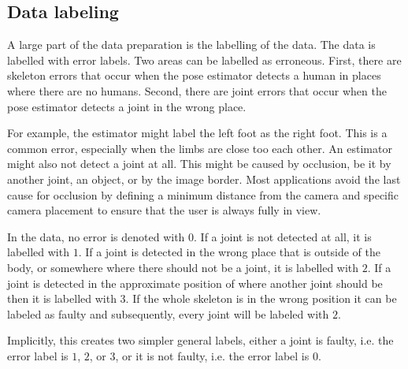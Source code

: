 \subsection{Data labeling}
\label{sec:data_labeling}

A large part of the data preparation is the labelling of the data. The data is labelled with error labels. Two areas can be labelled as erroneous. First, there are skeleton errors that occur when the pose estimator detects a human in places where there are no humans. Second, there are joint errors that occur when the pose estimator detects a joint in the wrong place. 

For example, the estimator might label the left foot as the right foot. This is a common error, especially when the limbs are close too each other. An estimator might also not detect a joint at all. This might be caused by occlusion, be it by another joint, an object, or by the image border. Most applications avoid the last cause for occlusion by defining a minimum distance from the camera and specific camera placement to ensure that the user is always fully in view.

In the data, no error is denoted with $0$. If a joint is not detected at all, it is labelled with $1$. If a joint is detected in the wrong place that is outside of the body, or somewhere where there should not be a joint, it is labelled with $2$. If a joint is detected in the approximate position of where another joint should be then it is labelled with $3$. If the whole skeleton is in the wrong position it can be labeled as faulty and subsequently, every joint will be labeled with $2$.

Implicitly, this creates two simpler general labels, either a joint is faulty, i.e. the error label is $1$, $2$, or $3$, or it is not faulty, i.e. the error label is $0$.